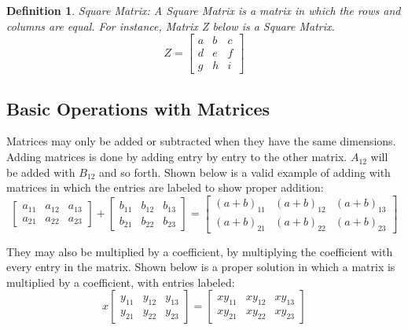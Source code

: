 \documentclass[final,1p,12pt]{elsarticle}
\newtheorem{definition}{Definition}
\begin{document}
    \begin{definition}Square Matrix:
        A Square Matrix is a matrix in which the rows and columns are equal. For instance, Matrix Z below is a Square Matrix.
        \begin{equation*}%
            Z =
            \begin{bmatrix}
                a & b & c\\
                d & e & f\\
                g & h & i
            \end{bmatrix}
        \end{equation*}
    \end{definition}
        
    \subsection{Basic Operations with Matrices}
        Matrices may only be added or subtracted when they have the same dimensions.
        Adding matrices is done by adding entry by entry to the other matrix.
        $A_{12}$ will be added with $B_{12}$ and so forth.
        Shown below is a valid example of adding with matrices in which the entries are labeled to show proper addition:
        \begin{equation*}
            \begin{bmatrix}
                a_{11} & a_{12} & a_{13} \\
                a_{21} & a_{22} & a_{23}
            \end{bmatrix}
            +
            \begin{bmatrix}
                b_{11} & b_{12} & b_{13} \\
                b_{21} & b_{22} & b_{23}
            \end{bmatrix}
            =
            \begin{bmatrix}
                (a+b)_{11} & (a+b)_{12} & (a+b)_{13} \\
                (a+b)_{21} & (a+b)_{22} & (a+b)_{23}
            \end{bmatrix}
        \end{equation*}
        
        They may also be multiplied by a coefficient, by multiplying the coefficient with every entry in the matrix.
        Shown below is a proper solution in which a matrix is multiplied by a coefficient, with entries labeled:
         \begin{equation*}
            x
            \begin{bmatrix}
                y_{11} & y_{12} & y_{13} \\
                y_{21} & y_{22} & y_{23}
            \end{bmatrix}
            =
            \begin{bmatrix}
                xy_{11} & xy_{12} & xy_{13} \\
                xy_{21} & xy_{22} & xy_{23}
            \end{bmatrix}
        \end{equation*}
        
\end{document}
